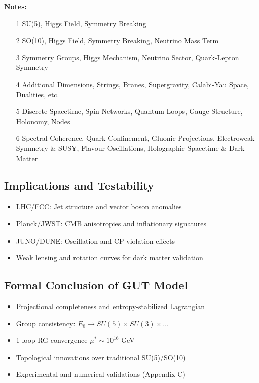 \documentclass[10.5pt,a4paper]{article}
\begin{document}
\noindent \textbf{Notes:}
\begin{itemize}
    \item [1] SU(5), Higgs Field, Symmetry Breaking
    \item [2] SO(10), Higgs Field, Symmetry Breaking, Neutrino Mass Term
    \item [3] Symmetry Groups, Higgs Mechanism, Neutrino Sector, Quark-Lepton Symmetry
    \item [4] Additional Dimensions, Strings, Branes, Supergravity, Calabi-Yau Space, Dualities, etc.
    \item [5] Discrete Spacetime, Spin Networks, Quantum Loops, Gauge Structure, Holonomy, Nodes
    \item [6] Spectral Coherence, Quark Confinement, Gluonic Projections, Electroweak Symmetry \& SUSY, Flavour Oscillations, Holographic Spacetime \& Dark Matter
\end{itemize}

\subsection{Implications and Testability}

\begin{itemize}
    \item LHC/FCC: Jet structure and vector boson anomalies
    \item Planck/JWST: CMB anisotropies and inflationary signatures
    \item JUNO/DUNE: Oscillation and CP violation effects
    \item Weak lensing and rotation curves for dark matter validation
\end{itemize}

\subsection{Formal Conclusion of GUT Model}

\begin{itemize}
    \item Projectional completeness and entropy-stabilized Lagrangian
    \item Group consistency: \(E_8 \to SU(5) \times SU(3) \times \dots\)
    \item 1-loop RG convergence \(\mu^* \sim 10^{16}\) GeV
    \item Topological innovations over traditional SU(5)/SO(10)
    \item Experimental and numerical validations (Appendix C)
\end{itemize}
\end{document}
